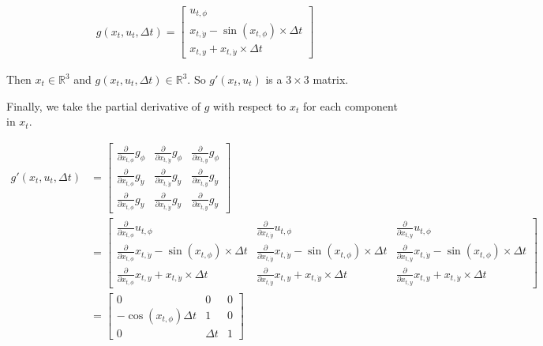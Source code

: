 \documentclass{article}
\begin{document}
\begin{align}
  g(x_t, u_t, \Delta t) = \left[\begin{array}{c} u_{t,\phi} \\ x_{t, \dot{y}} - \sin(x_{t,\phi}) \times \Delta t\\ x_{t,y} + x_{t,\dot{y}} \times \Delta t \end{array}\right]
\end{align}

Then $x_t \in \mathbb{R}^3$ and $g(x_t, u_t, \Delta t) \in
\mathbb{R}^3$.  So $g'(x_t, u_t)$ is a $3\times3$ matrix.


Finally, we take the partial derivative of $g$ with respect to $x_t$
for each component in $x_t$.

\begin{align}
  g'(x_t, u_t, \Delta t) &= \left[\begin{array}{cccc}
      \frac{\partial}{\partial x_{t,\phi}} g_\phi &
      \frac{\partial}{\partial x_{t,\dot{y}}} g_\phi &
      \frac{\partial}{\partial x_{t,y}} g_\phi\\
%
      \frac{\partial}{\partial x_{t,\phi}} g_{\dot{y}} &
      \frac{\partial}{\partial x_{t,\dot{y}}} g_{\dot{y}} &
      \frac{\partial}{\partial x_{t,y}} g_{\dot{y}}\\
%
      \frac{\partial}{\partial x_{t,\phi}} g_y &
      \frac{\partial}{\partial x_{t,\dot{y}}} g_y &
      \frac{\partial}{\partial x_{t,y}} g_y
    \end{array}\right]\\
&= \left[\begin{array}{cccc}
      \frac{\partial}{\partial x_{t,\phi}} u_{t,\phi} &
      \frac{\partial}{\partial x_{t,\dot{y}}} u_{t,\phi} &
      \frac{\partial}{\partial x_{t,y}} u_{t,\phi}\\
%
      \frac{\partial}{\partial x_{t,\phi}}  x_{t, \dot{y}} - \sin(x_{t,\phi}) \times \Delta t&
      \frac{\partial}{\partial x_{t,\dot{y}}} x_{t, \dot{y}} - \sin(x_{t,\phi}) \times \Delta t &
      \frac{\partial}{\partial x_{t,y}} x_{t, \dot{y}} - \sin(x_{t,\phi}) \times \Delta t\\
%
      \frac{\partial}{\partial x_{t,\phi}} x_{t,y} + x_{t,\dot{y}} \times \Delta t &
      \frac{\partial}{\partial x_{t,\dot{y}}}  x_{t,y} + x_{t,\dot{y}} \times \Delta t&
      \frac{\partial}{\partial x_{t,y}} x_{t,y} + x_{t,\dot{y}} \times \Delta t
    \end{array}\right]\\
&= \left[\begin{array}{cccc}
      0 &
      0 &
      0 \\
%
      -\cos(x_{t,\phi}) \Delta t &
      1 &
      0 \\
%
      0 &
      \Delta t &
      1
    \end{array}\right]
  \end{align}
\end{document}
